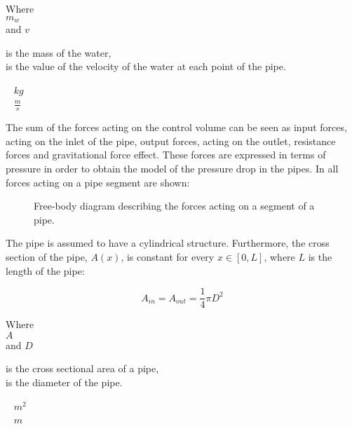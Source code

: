 \begin{minipage}[t]{0.20\textwidth}
Where\\
\hspace*{8mm} $m_w$ \\
and \hspace*{0.7mm} $v$ 
\end{minipage}
\begin{minipage}[t]{0.68\textwidth}
\vspace*{2mm}
is the mass of the water,\\
is the value of the velocity of the water at each point of the pipe.
\end{minipage}
\begin{minipage}[t]{0.10\textwidth}
\vspace*{2mm}
\textcolor{White}{te}$\unit{kg}$\\
\textcolor{White}{te}$\unit{\frac{m}{s}}$
\end{minipage}

The sum of the forces acting on the control volume can be seen as input forces, acting on the inlet of the pipe, output forces, acting on the outlet, resistance forces and gravitational force effect.  
These forces are expressed in terms of pressure in order to obtain the model of the pressure drop in the pipes. In  all forces acting on a pipe segment are shown:

\begin{figure}[H]
\centering
 
\caption{Free-body diagram describing the forces acting on a segment of a pipe.}
\label{fig:pipe_freebody}
\end{figure}

The pipe is assumed to have a cylindrical structure. Furthermore, the cross section of the pipe, $A(x)$, is constant for every $x \in [0,L]$, where $L$ is the length of the pipe:

\begin{equation}
  A_{in} = A_{out} = \frac{1}{4}\pi D^{2}
\end{equation}

 \begin{minipage}[t]{0.20\textwidth}
Where\\
\hspace*{8mm} $A$ \\
and \hspace*{0.7mm} $D$
\end{minipage}
\begin{minipage}[t]{0.68\textwidth}
\vspace*{2mm}
is the cross sectional area of a pipe,\\
is the diameter of the pipe.
\end{minipage}
\begin{minipage}[t]{0.10\textwidth}
\vspace*{2mm}
\textcolor{White}{te}$\unit{m^{2}}$\\
\textcolor{White}{te}$\unit{m}$
\end{minipage}

